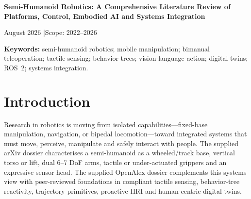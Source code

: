 \documentclass[10pt,a4paper]{article}
\begin{document}
\begin{center}
{\LARGE\bfseries Semi-Humanoid Robotics: A Comprehensive Literature Review of Platforms, Control, Embodied AI and Systems Integration\par}
\vspace{0.45em}
\small August 2026 \quad|\quad Scope: 2022--2026
\end{center}

\begin{abstract}
Semi-humanoid robotics joins a wheeled or tracked mobile base, a torso or lift, articulated arms, compliant end effectors and a sensorized interaction head. This report comprehensively consolidates two supplied literature reviews: an arXiv-oriented review of emerging open platforms, teleoperation and embodied-AI systems, and an OpenAlex-oriented review of peer-reviewed work on tactile sensing, task orchestration, human--robot interaction (HRI), digital twins and mobile manipulation. The reviewed evidence supports a systems research agenda in which the main challenge is not any isolated subsystem but the validated integration of modular mechanics, robust power and data interfaces, tactile contact, real-time safety, recovery logic, simulation and human-centred communication. The report separates source-reported findings from proposed design implications, retains all cited works and source-specific claims, and includes verbatim archival appendices of both supplied Markdown reports. Thus, no wording from the input dossiers is omitted from the report record.
\end{abstract}

\noindent\textbf{Keywords:} semi-humanoid robotics; mobile manipulation; bimanual teleoperation; tactile sensing; behavior trees; vision-language-action; digital twins; ROS~2; systems integration.

\section{Introduction}
Research in robotics is moving from isolated capabilities---fixed-base manipulation, navigation, or bipedal locomotion---toward integrated systems that must move, perceive, manipulate and safely interact with people. The supplied arXiv dossier characterises a semi-humanoid as a wheeled/track base, vertical torso or lift, dual 6--7 DoF arms, tactile or under-actuated grippers and an expressive sensor head. The supplied OpenAlex dossier complements this systems view with peer-reviewed foundations in compliant tactile sensing, behavior-tree reactivity, trajectory primitives, proactive HRI and human-centric digital twins.\cite{mobilealoha,yor,iovino,asad}
\end{document}
